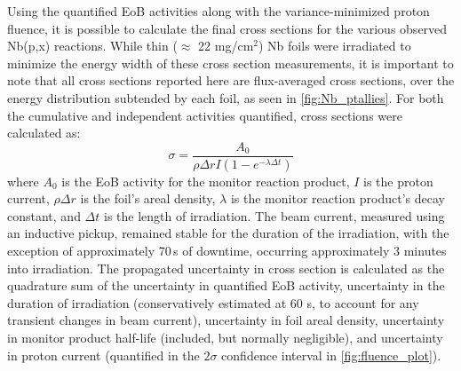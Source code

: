 \documentclass[%
 reprint,
superscriptaddress,
onecolumn,
linenumbers,
notitlepage,
 amsmath,amssymb,
 aps,
prc,
]{revtex4-1}
\newcommand{\pp}[1]{\left( #1\right)}
\begin{document}
Using the quantified EoB activities along with the variance-minimized proton fluence, it is possible to calculate the final cross sections for the various observed Nb(p,x) reactions.
While thin ($\approx$ 22 mg/cm$^2$) Nb foils were irradiated to minimize the energy width of these cross section measurements, it is important to note that all cross sections reported here are flux-averaged cross sections, over the energy distribution subtended by each foil, as seen in \autoref{fig:Nb_ptallies}.
For both the cumulative and independent activities quantified, cross sections were calculated as:
\begin{equation}
\sigma = \dfrac{A_0 }{\rho \Delta r I \pp{1-e^{-\lambda \Delta t}} }
\end{equation}
where $A_0$ is the EoB activity for the monitor reaction product, $I$ is the proton current, $\rho \Delta r$ is the foil's areal density, $\lambda$ is the monitor reaction product's decay constant, and $\Delta t$ is the length of irradiation.
The beam current, measured using an inductive pickup, remained stable for the duration of the irradiation, with the exception of approximately 70\,s of downtime,  occurring approximately 3 minutes into irradiation.
The propagated uncertainty in cross section is calculated as the quadrature sum of the uncertainty in quantified EoB activity, uncertainty in the duration of irradiation (conservatively estimated at 60 s, to account for any transient changes in beam current), uncertainty in foil areal density, uncertainty in monitor product half-life (included, but normally negligible),  and uncertainty in proton current (quantified in the $2\sigma$ confidence interval in \autoref{fig:fluence_plot}).





 
\end{document}
